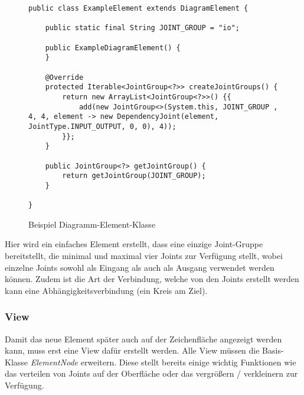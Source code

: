 \begin{figure}[h!]
	\centering
	\begin{lstlisting}
public class ExampleElement extends DiagramElement {

    public static final String JOINT_GROUP = "io";

    public ExampleDiagramElement() {
    }

    @Override
    protected Iterable<JointGroup<?>> createJointGroups() {
        return new ArrayList<JointGroup<?>>() {{
            add(new JointGroup<>(System.this, JOINT_GROUP , 4, 4, element -> new DependencyJoint(element, JointType.INPUT_OUTPUT, 0, 0), 4));
        }};
    }

    public JointGroup<?> getJointGroup() {
        return getJointGroup(JOINT_GROUP);
    }

}
	\end{lstlisting}
	\caption{Beispiel Diagramm-Element-Klasse}
\end{figure}
Hier wird ein einfaches Element erstellt, dass eine einzige Joint-Gruppe bereitstellt, die minimal und maximal
vier Joints zur Verfügung stellt, wobei einzelne Joints sowohl als Eingang als auch als Ausgang verwendet werden
können. Zudem ist die Art der Verbindung, welche von den Joints erstellt werden kann eine Abhängigkeitsverbindung
(ein Kreis am Ziel).
\subsubsection{View}
Damit das neue Element später auch auf der Zeichenfläche angezeigt werden kann, muss erst eine View dafür erstellt
werden. Alle View müssen die Basis-Klasse \textit{ElementNode} erweitern. Diese stellt bereits einige wichtig
Funktionen wie das verteilen von Joints auf der Oberfläche oder das vergrößern / verkleinern zur Verfügung.


